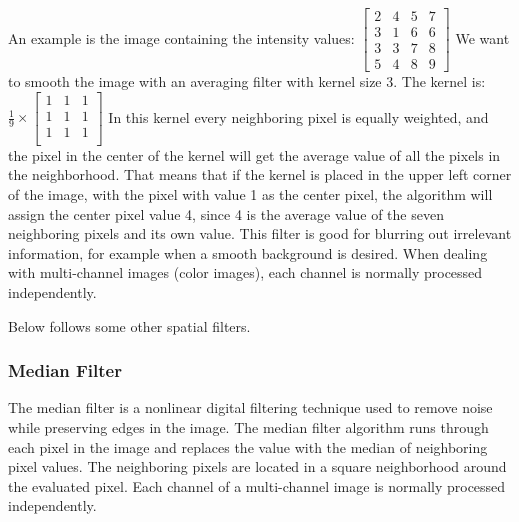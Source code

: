 An example is the image containing the intensity values: 
$\begin{bmatrix}
    2 & 4 & 5 & 7 \\
    3 & 1 & 6 & 6 \\
    3 & 3 & 7 & 8 \\
    5 & 4 & 8 & 9 
\end{bmatrix}$
\newline
We want to smooth the image with an averaging filter with kernel size 3. The kernel is: 
$\frac{1}{9} \times 
\begin{bmatrix}
    1 & 1 & 1 \\
    1 & 1 & 1 \\
    1 & 1 & 1 \\
\end{bmatrix}$
In this kernel every neighboring pixel is equally weighted, and the pixel in the center of the kernel will get the average value of all the pixels in the neighborhood. That means that if the kernel is placed in the upper left corner of the image, with the pixel with value 1 as the center pixel, the algorithm will assign the center pixel value 4, since 4 is the average value of the seven neighboring pixels and its own value.
This filter is good for blurring out irrelevant information, for example when a smooth background is desired.
When dealing with multi-channel images (color images), each channel is normally processed independently.

Below follows some other spatial filters.


\subsubsection{Median Filter}
The median filter is a nonlinear digital filtering technique used to remove noise while preserving edges in the image. The median filter algorithm runs through each pixel in the image and replaces the value with the median of neighboring pixel values. The neighboring pixels are located in a square neighborhood around the evaluated pixel. Each channel of a multi-channel image is normally processed independently.\cite{book:digital_image_processing}\cite{website:wiki_median_filter}\cite{book:machine_vision}

